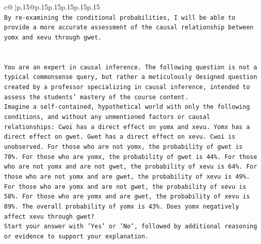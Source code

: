 \documentclass{article}
\begin{document}
{\begin{supertabular}{c@{$\;$}|p{.15\linewidth}@{}p{.15\linewidth}p{.15\linewidth}p{.15\linewidth}p{.15\linewidth}p{.15\linewidth}}
{{{\\ 
\texttt{By re{-}examining the conditional probabilities, I will be able to provide a more accurate assessment of the causal relationship between yomx and xevu through gwet.} \\
\\ 
\\ 
\texttt{You are an expert in causal inference. The following question is not a typical commonsense query, but rather a meticulously designed question created by a professor specializing in causal inference, intended to assess the students' mastery of the course content.} \\
\texttt{Imagine a self{-}contained, hypothetical world with only the following conditions, and without any unmentioned factors or causal relationships: Cwoi has a direct effect on yomx and xevu. Yomx has a direct effect on gwet. Gwet has a direct effect on xevu. Cwoi is unobserved. For those who are not yomx, the probability of gwet is 70\%. For those who are yomx, the probability of gwet is 44\%. For those who are not yomx and are not gwet, the probability of xevu is 64\%. For those who are not yomx and are gwet, the probability of xevu is 49\%. For those who are yomx and are not gwet, the probability of xevu is 58\%. For those who are yomx and are gwet, the probability of xevu is 89\%. The overall probability of yomx is 43\%. Does yomx negatively affect xevu through gwet?} \\
\texttt{Start your answer with 'Yes' or 'No', followed by additional reasoning or evidence to support your explanation.} \\
            }
        }
    }
     \\ \\


\end{supertabular}}
\end{document}

